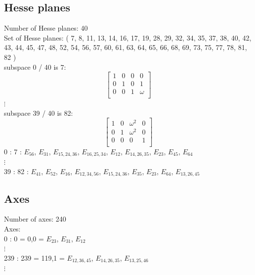 \subsection*{Hesse planes}
Number of Hesse planes: 40\\
Set of Hesse planes: ( 7, 8, 11, 13, 14, 16, 17, 19, 28, 29, 32, 34, 35, 37, 38, 40, 42, 43, 44, 45, 47, 48, 52, 54, 56, 57, 60, 61, 63, 64, 65, 66, 68, 69, 73, 75, 77, 78, 81, 82 )\\
subspace 0 / 40 is 7:\\
$$
\left[
\begin{array}{*{4}{r}}
1 & 0 & 0 & 0\\
0 & 1 & 0 & 1\\
0 & 0 & 1 & \omega \\
\end{array}
\right]
$$
$\vdots$\\
subspace 39 / 40 is 82:\\
$$
\left[
\begin{array}{*{4}{r}}
1 & 0 & \omega^{2} & 0\\
0 & 1 & \omega^{2} & 0\\
0 & 0 & 0 & 1\\
\end{array}
\right]
$$
0 : 7 : $E_{56}$, $E_{31}$, $E_{15,24,36}$, $E_{16,25,34}$, $E_{12}$, $E_{14,26,35}$, $E_{23}$, $E_{45}$, $E_{64}$\\
$\vdots$\\
39 : 82 : $E_{41}$, $E_{52}$, $E_{16}$, $E_{12,34,56}$, $E_{15,24,36}$, $E_{35}$, $E_{23}$, $E_{64}$, $E_{13,26,45}$\\
\subsection*{Axes}
Number of axes: 240\\
Axes: \\
0 : 0 = 0,0 = 
$E_{23}$, $E_{31}$, $E_{12}$\\
$\vdots$\\
239 : 239 = 119,1 = 
$E_{12,36,45}$, $E_{14,26,35}$, $E_{13,25,46}$\\
$\vdots$\\
